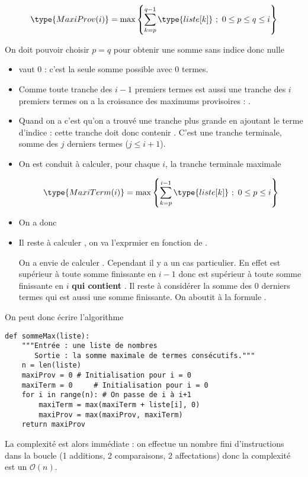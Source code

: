 \[\type{MaxiProv(i)}= \max\left\{ \sum_{k=p}^{q-1} \type{liste[k]}\ ;\ 0 \le p \le q \le i\right\}\]

On doit pouvoir choisir $p = q$ pour obtenir une somme sans indice donc nulle

\begin{itemize}
\item {} vaut 0 : c'est la seule somme possible avec 0 termes.

\item Comme toute tranche des $i-1$ premiers termes est aussi une tranche des $i$ premiers termes on a la croissance des maximums provisoires : .

\item Quand on a  c'est qu'on a trouvé une tranche plus grande en ajoutant le terme d'indice  : cette tranche doit donc contenir . C'est une tranche terminale, somme des $j$ derniers termes ($j \le i+1$).

\item On est conduit à calculer, pour chaque $i$, la tranche terminale maximale 

\[\type{ MaxiTerm(i)}= \max\left\{ \sum_{k=p}^{i-1} \type{liste[k]}\ ;\ 0 \le p \le i\right\}\]

\item On a donc 

\item Il reste à calculer , on va l'exprmier en fonction de .

On a envie de calculer . Cependant il y a un cas particulier. En effet  est supérieur à toute somme finissante en $i-1$ donc  est supérieur à toute somme finissante en $i$ {\bf qui contient }. Il reste à considérer la somme des 0 derniers termes qui est aussi une somme finissante. On aboutit à la formule .
\end{itemize}
On peut donc écrire l'algorithme 
\begin{lstlisting}
def sommeMax(liste):
    """Entrée : une liste de nombres
       Sortie : la somme maximale de termes consécutifs."""
    n = len(liste)
    maxiProv = 0 # Initialisation pour i = 0
    maxiTerm = 0     # Initialisation pour i = 0
    for i in range(n): # On passe de i à i+1
        maxiTerm = max(maxiTerm + liste[i], 0)
        maxiProv = max(maxiProv, maxiTerm)
    return maxiProv
\end{lstlisting}
La complexité est alors immédiate : on effectue un nombre fini d'instructions dans la boucle (1 additions, 2 comparaisons, 2 affectations) donc la complexité est un ${\mathcal O}(n)$.
\newpage
